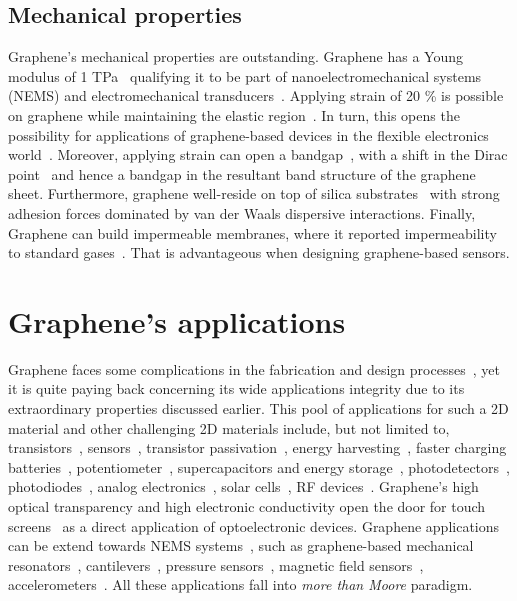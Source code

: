 \subsection{Mechanical properties}
Graphene's mechanical properties are outstanding. Graphene has a Young modulus of 1 TPa~\cite{Lee2008, Lee2013} qualifying it to be part of nanoelectromechanical systems (NEMS) and electromechanical transducers~\cite{Smith2013, Smith2016a}. Applying strain of 20 \% is possible on graphene while maintaining the elastic region~\cite{Tomori2011}.  In turn, this opens the possibility for applications of graphene-based devices in the flexible electronics world~\cite{Fiori2014nature}. Moreover, applying strain can open a bandgap~\cite{Cocco2010}, with a shift in the Dirac point~\cite{Montambaux2009, Pereira2009, Li2014} and hence a bandgap in the resultant band structure of the graphene sheet. Furthermore, graphene well-reside on top of silica substrates~\cite{Koenig2011, Rudenko2011, Zhao2017} with strong adhesion forces dominated by van der Waals dispersive interactions. Finally, Graphene can build impermeable membranes, where it reported impermeability to standard gases~\cite{Bunch2008}. That is advantageous when designing graphene-based sensors.
%
\section{Graphene's applications}
Graphene faces some complications in the fabrication and design processes~\cite{Smith2016a, Fiori2014nature}, yet it is quite paying back concerning its wide applications integrity due to its extraordinary properties discussed earlier. This pool of applications for such a 2D material and other challenging 2D materials include, but not limited to, transistors~\cite{Lemme2012, Lemme2012a}, sensors~\cite{Smith2015, Smith2016a, Smith2017, Xuge2017, Feng2014, Wang2015, Yue2013, Zhao2014, Llobet2013}, transistor passivation~\cite{Smith2016}, energy harvesting~\cite{GRANDE2012}, faster charging batteries~\cite{Son2017}, potentiometer~\cite{Levesque2011}, supercapacitors and energy storage~\cite{Yoo2011, Brownson2012, Liu2010}, photodetectors~\cite{Mueller2010, Naiini2014, Lemme2011}, photodiodes~\cite{Riazimehr2017}, analog electronics~\cite{Fiori2014}, solar cells~\cite{Wang2008, Miao2012}, RF devices~\cite{Fiori2014nature}. Graphene's high optical transparency and high electronic conductivity open the door for touch screens~\cite{Ferrari2015} as a direct application of optoelectronic devices. Graphene applications can be extend towards NEMS systems~\cite{Chen2013}, such as graphene-based mechanical resonators~\cite{Bunch2007, Castellanos2015, Chen2013}, cantilevers~\cite{Conley2011}, pressure sensors~\cite{Smith2012, Smith2013b, Smith2014, Wagner2016}, magnetic field sensors~\cite{Dauber2015}, accelerometers~\cite{memsPatent}. All these applications fall into \textit{more than Moore} paradigm.
